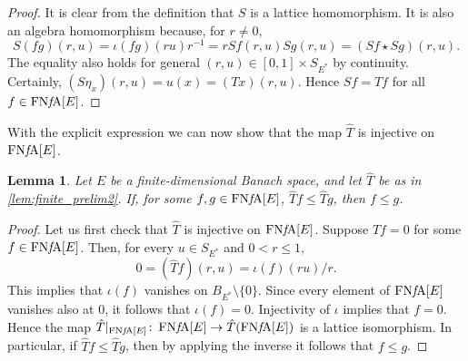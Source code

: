 \documentclass{memo-l}
\newtheorem{lem}[theorem]{Lemma}
\theoremstyle{definition}
\theoremstyle{remark}
\numberwithin{section}{chapter}
\numberwithin{equation}{chapter}
\newcommand{\FNFA}[1]{\operatorname{FN{\it f}\!A}[#1]}
\begin{document}
\begin{proof}
    It is clear
    from the definition that $S$ is a lattice homomorphism. It is also
    an algebra homomorphism because, for $r\neq 0$,
    \[
    S(fg)(r,u)=\iota (fg)(ru)r^{-1}=r Sf(r,u) Sg(r,u)=(Sf\star Sg)(r,u).
    \]
    The equality also holds for general $(r,u)\in [0,1]\times
    S_{E^{*}}$ by continuity. Certainly, $(S\eta _x)(r,u)=u(x)=(Tx)(r,u)$. Hence $Sf=\hat{T}f$ for all $f \in \FNFA E$.
\end{proof}

With the explicit expression we can now show that the map $\hat{T}$ is
injective on $\FNFA E$.

\begin{lem}\label{lem:finite_prelim3}
    Let $E$ be a finite-dimensional Banach space, and let $\hat{T}$ be
    as in \cref{lem:finite_prelim2}. If, for some $f,g \in \FNFA E$,
    $\hat{T}f\le \hat{T}g$, then $f\le g$.
\end{lem}
\begin{proof}
    Let us first check that $\hat{T}$ is injective on $\FNFA E$.
    Suppose $\hat{T}f=0$ for some $f \in \FNFA E$. Then, for every
    $u \in S_{E^{*}}$ and $0<r\le 1$,
    \[
        0=(\hat{T}f)(r,u)=\iota (f)(ru)/r.
    \]
    This implies that $\iota (f)$ vanishes on $B_{E^{*}}\setminus \{0\}$.
    Since every element of $\FNFA E$ vanishes also at $0$, it follows
    that $\iota (f)=0$. Injectivity of $\iota $ implies that $f=0$. Hence the map $\hat{T}|_{\FNFA E}\colon \FNFA E\to
    \hat{T}(\FNFA E)$ is a lattice isomorphism. In particular, if
    $\hat{T}f\le \hat{T}g$, then by applying the inverse it follows
    that $f\le g$.
\end{proof}
\end{document}
